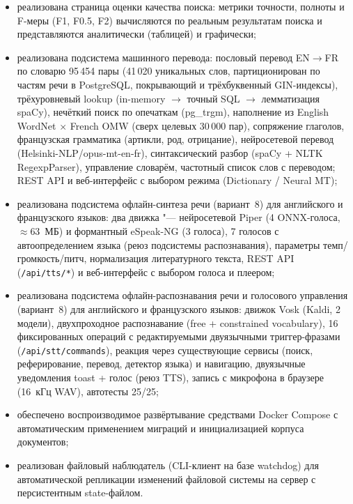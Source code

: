 \begin{itemize}
	\item реализована страница оценки качества поиска: метрики точности, полноты и F-меры (F1, F0.5, F2) вычисляются по реальным результатам поиска и представляются аналитически (таблицей) и графически;
	\item реализована подсистема машинного перевода: пословый перевод EN$\to$FR
	      по словарю 95\,454 пары (41\,020 уникальных слов, партиционирован
	      по частям речи в PostgreSQL, покрывающий и трёхбуквенный GIN-индексы),
	      трёхуровневый lookup (in-memory $\to$ точный SQL $\to$ лемматизация spaCy),
	      нечёткий поиск по опечаткам (pg\_trgm), наполнение из English WordNet
	      $\times$ French OMW (сверх целевых 30\,000 пар),
	      сопряжение глаголов, французская грамматика (артикли, род, отрицание),
	      нейросетевой перевод (Helsinki-NLP/opus-mt-en-fr),
	      синтаксический разбор (spaCy + NLTK RegexpParser),
	      управление словарём, частотный список слов с переводом;
	      REST API и веб-интерфейс с выбором режима (Dictionary / Neural MT);
	\item реализована подсистема офлайн-синтеза речи (вариант~8) для
	      английского и французского языков: два движка "--- нейросетевой
	      Piper (4 ONNX-голоса, $\approx$63~МБ) и формантный eSpeak-NG
	      (3 голоса), 7 голосов с автоопределением языка (реюз подсистемы
	      распознавания), параметры темп/громкость/питч, нормализация
	      литературного текста, REST API (\texttt{/api/tts/*}) и
	      веб-интерфейс с выбором голоса и плеером;
	\item реализована подсистема офлайн-распознавания речи и голосового
	      управления (вариант~8) для английского и французского языков:
	      движок Vosk (Kaldi, 2 модели), двухпроходное распознавание
	      (free + constrained vocabulary), 16 фиксированных операций
	      с редактируемыми двуязычными триггер-фразами
	      (\texttt{/api/stt/commands}), реакция через существующие
	      сервисы (поиск, реферирование, перевод, детектор языка)
	      и навигацию, двуязычные уведомления toast + голос (реюз TTS),
	      запись с микрофона в браузере (16~кГц WAV), автотесты 25/25;
	\item обеспечено воспроизводимое развёртывание средствами Docker Compose с автоматическим применением миграций и инициализацией корпуса документов;
	\item реализован файловый наблюдатель (CLI-клиент на базе watchdog) для автоматической репликации изменений файловой системы на сервер с персистентным state-файлом.
\end{itemize}

